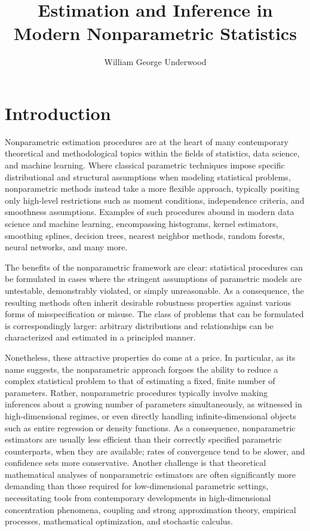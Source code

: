 \documentclass[11pt,lof]{puthesis}
\author{William George Underwood}
\title{Estimation and Inference in \\ Modern Nonparametric Statistics}
\theoremstyle{break}
\theoremstyle{proof}
\begin{document}
\chapter{Introduction}

Nonparametric estimation procedures are at the heart of many contemporary
theoretical and methodological topics within the fields of statistics, data
science, and machine learning. Where classical parametric techniques impose
specific distributional and structural assumptions when modeling statistical
problems, nonparametric methods instead take a more flexible approach,
typically positing only high-level restrictions such as moment conditions,
independence criteria, and smoothness assumptions. Examples of such procedures
abound in modern data science and machine learning, encompassing histograms,
kernel estimators, smoothing splines, decision trees, nearest neighbor methods,
random forests, neural networks, and many more.

The benefits of the nonparametric framework are clear: statistical procedures
can be formulated in cases where the stringent assumptions of parametric models
are untestable, demonstrably violated, or simply unreasonable.
As a consequence,
the resulting methods often inherit desirable robustness properties against
various forms of misspecification or misuse. The class of problems that can be
formulated is correspondingly larger: arbitrary distributions and
relationships can be characterized and estimated in a principled manner.

Nonetheless, these attractive properties do come at a price. In particular, as
its name suggests, the nonparametric approach forgoes the ability to reduce
a complex statistical problem to that of estimating a fixed, finite number of
parameters. Rather, nonparametric procedures typically involve making inferences
about a growing number of parameters simultaneously, as witnessed in
high-dimensional regimes, or even directly handling infinite-dimensional
objects such as entire regression or density functions. As a consequence,
nonparametric estimators are usually less efficient than their
correctly specified parametric counterparts, when they are available; rates of
convergence tend to be slower, and confidence sets more conservative. Another
challenge is that theoretical mathematical analyses of nonparametric estimators
are often significantly more demanding than those required for low-dimensional
parametric settings, necessitating tools from contemporary developments in
high-dimensional concentration phenomena, coupling and strong approximation
theory, empirical processes, mathematical optimization, and stochastic
calculus.
\end{document}

